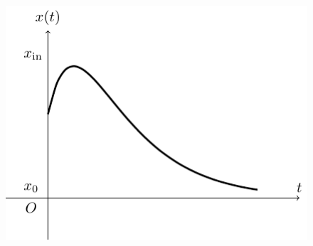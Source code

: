 \documentclass{article}
\numberwithin{equation}{subsection}
\begin{document}
\begin{figure}[H]%
    \centering
    \includegraphics{oscillatorio-2.pdf}%
\end{figure}
\end{document}
